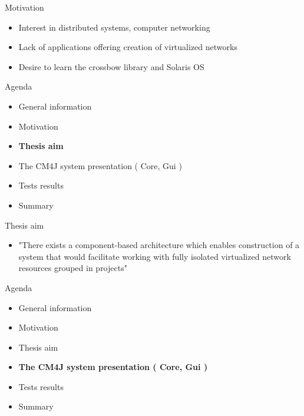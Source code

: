 \documentclass{beamer}
\begin{document}
	\begin{frame}{Motivation}
		\begin{itemize}
			\item Interest in distributed systems, computer networking
			\item Lack of applications offering creation of virtualized networks
			\item Desire to learn the crossbow library and Solaris OS
		\end{itemize}
	\end{frame}

	\begin{frame}{Agenda}

		\begin{itemize}
			\item General information
			\item Motivation
			\item \textbf{Thesis aim}
			\item The CM4J system presentation ( Core, Gui )
			\item Tests results
			\item Summary
		\end{itemize}

	\end{frame}

	\begin{frame}{Thesis aim}
		\begin{itemize}
			\item "There exists a component-based architecture which enables construction of a system that would facilitate working with fully isolated virtualized network resources grouped in projects"
		\end{itemize}
	\end{frame}

	\begin{frame}{Agenda}

		\begin{itemize}
			\item General information
			\item Motivation
			\item Thesis aim
			\item \textbf{The CM4J system presentation ( Core, Gui )}
			\item Tests results
			\item Summary
		\end{itemize}

	\end{frame}
\end{document}
